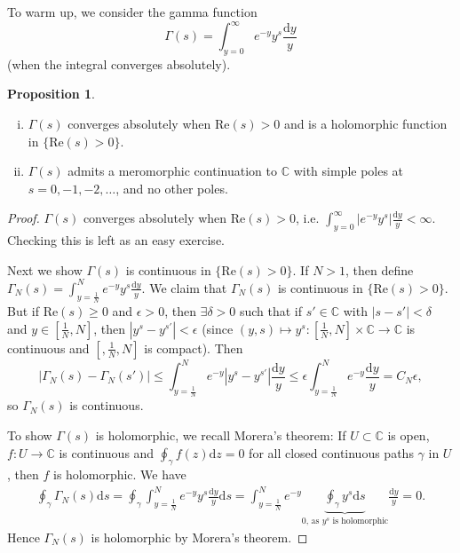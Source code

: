 \documentclass{article}
\theoremstyle{definition}
\newtheorem{prop}[theorem]{Proposition}
\begin{document}
To warm up, we consider the gamma function $$\Gamma(s) = \int_{y=0}^{\infty} e^{-y}y^s \frac{\mathrm{d}y}{y}$$ (when the integral converges absolutely).
\begin{prop}
    \begin{enumerate}[(i)]
        \item $\Gamma(s)$ converges absolutely when $\text{Re}(s)>0$ and is a holomorphic function in $\{\text{Re}(s)>0\}$.
        \item $\Gamma(s)$ admits a meromorphic continuation to $\mathbb{C}$ with simple poles at $s =0,-1,-2,\ldots$, and no other poles.
    \end{enumerate}
\end{prop}
\begin{proof}
    $\Gamma(s)$ converges absolutely when $\text{Re}(s)>0$, i.e. $\int_{y=0}^{\infty} |e^{-y}y^{s}|\frac{\mathrm{d}y}{y} < \infty$. Checking this is left as an easy exercise.
    \vspace{1mm}
     
    Next we show $\Gamma(s)$ is continuous in $\{\text{Re}(s)>0\}$. If $N>1$, then define $\Gamma_N(s) = \int_{y=\frac{1}{N}}^{N} e^{-y}y^s \frac{\mathrm{d}y}{y}$. We claim that $\Gamma_N(s)$ is continuous in $\{\text{Re}(s)>0\}$. But if $\text{Re}(s)\ge 0$ and $\epsilon>0$, then $\exists \delta>0$ such that if $s' \in \mathbb{C}$ with $|s-s'|<\delta$ and $y \in \left[\frac{1}{N},N \right]$, then $|y^s-y^{s'}|<\epsilon$ (since $(y,s) \mapsto y^s : \left[\frac{1}{N},N \right] \times \mathbb{C} \to \mathbb{C}$ is continuous and $\left[,\frac{1}{N},N \right]$ is compact). Then $$|\Gamma_N(s)-\Gamma_N(s')|\le \int_{y=\frac{1}{N}}^{N} e^{-y}|y^s-y^{s'}|\frac{\mathrm{d}y}{y} \le \epsilon \int_{y=\frac{1}{N}}^{N} e^{-y} \frac{\mathrm{d}y}{y} = C_N \epsilon,$$
    so $\Gamma_N(s)$ is continuous. 
    \vspace{1mm}
     
    To show $\Gamma(s)$ is holomorphic, we recall Morera's theorem: If $U \subset \mathbb{C}$ is open, $f : U \to \mathbb{C}$ is continuous and $\oint_{\gamma} f(z) \mathrm{d}z = 0$ for all closed continuous paths $\gamma$ in $U$, then $f$ is holomorphic. We have
    \begin{align*}
        \oint_{\gamma}\Gamma_N(s) \mathrm{d}s = \oint_\gamma \int_{y=\frac{1}{N}}^{N} e^{-y}y^s\frac{\mathrm{d}y}{y}\mathrm{d}s = \int_{y=\frac{1}{N}}^{N} e^{-y} \underbrace{\oint_{\gamma} y^s \mathrm{d}s}_{0\text{, as }y^s \text{ is holomorphic}} \frac{\mathrm{d}y}{y} = 0.
    \end{align*}
    Hence $\Gamma_N(s)$ is holomorphic by Morera's theorem.
    \vspace{1mm}
     

\end{proof}
\end{document}
